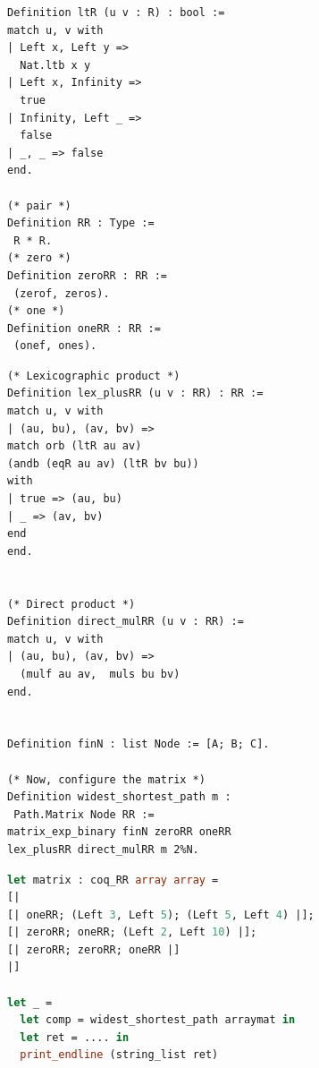 \documentclass[a4paper,UKenglish,cleveref, autoref, thm-restate, anonymous]{lipics-v2021}
\begin{document}
\begin{minipage}{0.5\linewidth}
\begin{lstlisting}[language=Coq]
Definition ltR (u v : R) : bool :=
match u, v with 
| Left x, Left y => 
  Nat.ltb x y 
| Left x, Infinity => 
  true 
| Infinity, Left _ => 
  false 
| _, _ => false
end.

(* pair *)
Definition RR : Type := 
 R * R. 
(* zero *)
Definition zeroRR : RR := 
 (zerof, zeros). 
(* one *)
Definition oneRR : RR := 
 (onef, ones).
\end{lstlisting}
\end{minipage}
\hfill
\begin{minipage}{0.40\linewidth}
\begin{lstlisting}[language=Coq]
(* Lexicographic product *)
Definition lex_plusRR (u v : RR) : RR :=
match u, v with 
| (au, bu), (av, bv) => 
match orb (ltR au av) 
(andb (eqR au av) (ltR bv bu)) 
with 
| true => (au, bu)
| _ => (av, bv)
end 
end. 


(* Direct product *)
Definition direct_mulRR (u v : RR) :=
match u, v with 
| (au, bu), (av, bv) => 
  (mulf au av,  muls bu bv)
end.  


Definition finN : list Node := [A; B; C].

(* Now, configure the matrix *)
Definition widest_shortest_path m : 
 Path.Matrix Node RR :=
matrix_exp_binary finN zeroRR oneRR 
lex_plusRR direct_mulRR m 2%N.

\end{lstlisting}
\end{minipage}




\begin{center}
\begin{minipage}[t]{0.7\linewidth}
\begin{lstlisting}[language=Caml]
let matrix : coq_RR array array = 
[|
[| oneRR; (Left 3, Left 5); (Left 5, Left 4) |];
[| zeroRR; oneRR; (Left 2, Left 10) |];
[| zeroRR; zeroRR; oneRR |]
|]

let _ = 
  let comp = widest_shortest_path arraymat in 
  let ret = .... in 
  print_endline (string_list ret)
\end{lstlisting}
\end{minipage}
\end{center}
\end{document}
